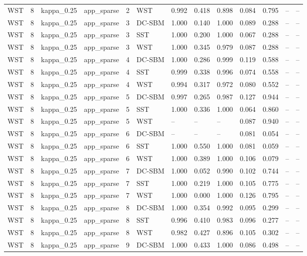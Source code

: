 \begin{table}[!h]
\begin{tabular}[t]{lllllllllllll}
WST & 8 & kappa_0.25 & app_sparse & 2 & WST & 0.992 & 0.418 & 0.898 & 0.084 & 0.795 & -- & --\\
WST & 8 & kappa_0.25 & app_sparse & 3 & DC-SBM & 1.000 & 0.140 & 1.000 & 0.089 & 0.288 & -- & --\\
WST & 8 & kappa_0.25 & app_sparse & 3 & SST & 1.000 & 0.200 & 1.000 & 0.067 & 0.288 & -- & --\\
WST & 8 & kappa_0.25 & app_sparse & 3 & WST & 1.000 & 0.345 & 0.979 & 0.087 & 0.288 & -- & --\\
WST & 8 & kappa_0.25 & app_sparse & 4 & DC-SBM & 1.000 & 0.286 & 0.999 & 0.119 & 0.588 & -- & --\\
WST & 8 & kappa_0.25 & app_sparse & 4 & SST & 0.999 & 0.338 & 0.996 & 0.074 & 0.558 & -- & --\\
WST & 8 & kappa_0.25 & app_sparse & 4 & WST & 0.994 & 0.317 & 0.972 & 0.080 & 0.552 & -- & --\\
WST & 8 & kappa_0.25 & app_sparse & 5 & DC-SBM & 0.997 & 0.265 & 0.987 & 0.127 & 0.944 & -- & --\\
WST & 8 & kappa_0.25 & app_sparse & 5 & SST & 1.000 & 0.336 & 1.000 & 0.064 & 0.860 & -- & --\\
WST & 8 & kappa_0.25 & app_sparse & 5 & WST & -- & -- & -- & 0.087 & 0.940 & -- & --\\
WST & 8 & kappa_0.25 & app_sparse & 6 & DC-SBM & -- & -- & -- & 0.081 & 0.054 & -- & --\\
WST & 8 & kappa_0.25 & app_sparse & 6 & SST & 1.000 & 0.550 & 1.000 & 0.081 & 0.059 & -- & --\\
WST & 8 & kappa_0.25 & app_sparse & 6 & WST & 1.000 & 0.389 & 1.000 & 0.106 & 0.079 & -- & --\\
WST & 8 & kappa_0.25 & app_sparse & 7 & DC-SBM & 1.000 & 0.052 & 0.990 & 0.102 & 0.744 & -- & --\\
WST & 8 & kappa_0.25 & app_sparse & 7 & SST & 1.000 & 0.219 & 1.000 & 0.105 & 0.775 & -- & --\\
WST & 8 & kappa_0.25 & app_sparse & 7 & WST & 1.000 & 0.000 & 1.000 & 0.126 & 0.795 & -- & --\\
WST & 8 & kappa_0.25 & app_sparse & 8 & DC-SBM & 1.000 & 0.354 & 0.992 & 0.095 & 0.299 & -- & --\\
WST & 8 & kappa_0.25 & app_sparse & 8 & SST & 0.996 & 0.410 & 0.983 & 0.096 & 0.277 & -- & --\\
WST & 8 & kappa_0.25 & app_sparse & 8 & WST & 0.982 & 0.427 & 0.896 & 0.105 & 0.302 & -- & --\\
WST & 8 & kappa_0.25 & app_sparse & 9 & DC-SBM & 1.000 & 0.433 & 1.000 & 0.086 & 0.498 & -- & --\\

\end{tabular}
\end{table}
